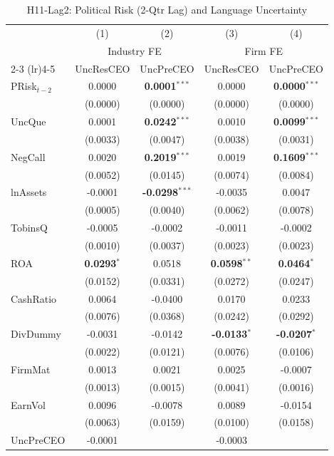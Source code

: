 \documentclass[11pt,a4paper]{article}
\begin{document}
\begin{table}[htbp]
\centering
\caption{H11-Lag2: Political Risk (2-Qtr Lag) and Language Uncertainty}
\label{tab:h11_lag2}
\scriptsize
\begin{tabular}{lcccc}
\toprule
 & (1) & (2) & (3) & (4) \\
 & \multicolumn{2}{c}{Industry FE} & \multicolumn{2}{c}{Firm FE} \\
\cmidrule(lr){2-3} \cmidrule(lr){4-5}
 & UncResCEO & UncPreCEO & UncResCEO & UncPreCEO \\
\midrule
PRisk$_{t-2}$ & 0.0000 & \textbf{0.0001}$^{***}$ & 0.0000 & \textbf{0.0000}$^{***}$ \\
 & (0.0000) & (0.0000) & (0.0000) & (0.0000) \\
\midrule
UncQue & 0.0001 & \textbf{0.0242}$^{***}$ & 0.0010 & \textbf{0.0099}$^{***}$ \\
 & (0.0033) & (0.0047) & (0.0038) & (0.0031) \\
NegCall & 0.0020 & \textbf{0.2019}$^{***}$ & 0.0019 & \textbf{0.1609}$^{***}$ \\
 & (0.0052) & (0.0145) & (0.0074) & (0.0084) \\
lnAssets & -0.0001 & \textbf{-0.0298}$^{***}$ & -0.0035 & 0.0047 \\
 & (0.0005) & (0.0040) & (0.0062) & (0.0078) \\
TobinsQ & -0.0005 & -0.0002 & -0.0011 & -0.0002 \\
 & (0.0010) & (0.0037) & (0.0023) & (0.0023) \\
ROA & \textbf{0.0293}$^{*}$ & 0.0518 & \textbf{0.0598}$^{**}$ & \textbf{0.0464}$^{*}$ \\
 & (0.0152) & (0.0331) & (0.0272) & (0.0247) \\
CashRatio & 0.0064 & -0.0400 & 0.0170 & 0.0233 \\
 & (0.0076) & (0.0368) & (0.0242) & (0.0292) \\
DivDummy & -0.0031 & -0.0142 & \textbf{-0.0133}$^{*}$ & \textbf{-0.0207}$^{*}$ \\
 & (0.0022) & (0.0121) & (0.0076) & (0.0106) \\
FirmMat & 0.0013 & 0.0021 & 0.0025 & -0.0007 \\
 & (0.0013) & (0.0015) & (0.0041) & (0.0016) \\
EarnVol & 0.0096 & -0.0078 & 0.0089 & -0.0154 \\
 & (0.0063) & (0.0159) & (0.0100) & (0.0158) \\
UncPreCEO & -0.0001 &  & -0.0003 &  \\

\end{tabular}
\end{table}
\end{document}
